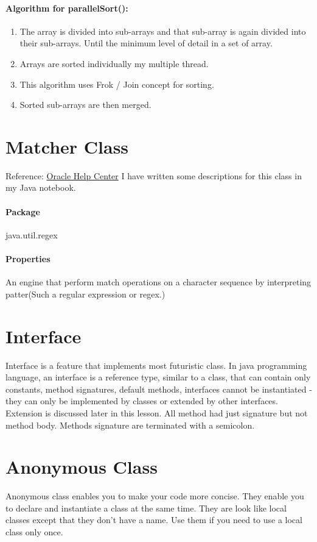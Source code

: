 \paragraph{Algorithm for parallelSort():}
	\begin{enumerate}
		\item The array is divided into sub-arrays and that sub-array is again divided into their sub-arrays. Until the minimum level of detail in a set of array.
		\item Arrays are sorted individually my multiple thread.
		\item This algorithm uses Frok / Join concept for sorting.
		\item Sorted sub-arrays are then merged.
	\end{enumerate}

\section{Matcher Class}
Reference: \href{https://docs.oracle.com/javase/7/docs/api/java/util/regex/Matcher.html}{Oracle Help Center}\linebreak
I have written some descriptions for this class in my Java notebook.

\paragraph{Package}
java.util.regex
\paragraph{Properties}
An engine that perform match operations on a character sequence by interpreting patter(Such a regular expression or regex.)

\section{Interface}
Interface is a feature that implements most futuristic class. In java programming language, an interface is a reference type, similar to a class, that can contain only constants, method signatures, default methods, interfaces cannot be instantiated - they can only be implemented by classes or extended by other interfaces. Extension is discussed later in this lesson. All method had just signature but not method body. Methods signature are terminated with a semicolon.

\section{Anonymous Class}
Anonymous class enables you to make your code more concise. They enable you to declare and instantiate a class at the same time. They are look like local classes except that they don't have a name.\hfill
Use them if you need to use a local class only once.

